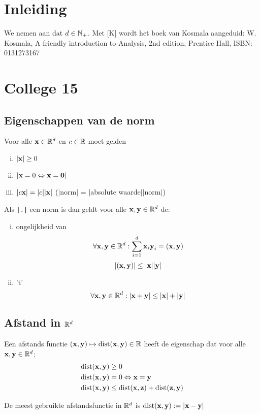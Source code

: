 \documentclass{2wa40summary}
\begin{document}
	\maketitle
	\thispagestyle{empty}
	\newpage
	
	\section{Inleiding}
	We nemen aan dat $d\in\naturals_+$. Met [K] wordt het boek van Kosmala aangeduid: W. Kosmala, A friendly introduction to Analysis, 2nd edition, Prentice Hall, ISBN: 0131273167
	
	\section{College 15}
	\subsection{Eigenschappen van de norm}
	Voor alle $\x\in \reals^d$ en $c\in\reals$ moet gelden
	\begin{enumerate}[(i)]
		\item $|\x| \geq 0$
		\item $\abs{\x=0 \Leftrightarrow \x=\zero}$
		\item $|c\x|=|c||\x|$ ($|$norm$|$ = $|$absolute waarde$||$norm$|$)
	\end{enumerate}
	Als \verb#|.|# een norm is dan geldt voor alle $\x,\y\in \reals^d$ de:
	\begin{enumerate}[(i)]
		\item ongelijkheid van 
		\[\forall \x,\y \in \reals^d: \sum_{i=1}^{d}\x_i \y_i = (\x,\y)\]
		\[|(\x,\y)| \leq |\x||\y|\]
		\item {} 't'
		\[\forall \x,\y \in \reals^d: |\x+\y|\leq |\x|+|\y|\]
	\end{enumerate}
	\subsection{Afstand in $\reals^d$}
	\begin{define}
		Een afstands functie $(\x,\y)\mapsto\dist(\x,\y)\in\reals$ heeft de eigenschap dat voor alle $\x,\y\in\reals^d$:
		\begin{align*}
		\dist(\x,\y) & \geq 0 \\
		\dist(\x,\y) & =0 \Leftrightarrow \x=\y \\
		\dist(\x,\y) & \leq \dist(\x,\z) + \dist(\z,\y)
		\end{align*}
	\end{define}
	De meest gebruikte afstandsfunctie in $\reals^d$ is $\dist(\x,\y):=|\x-\y|$
	
\end{document}
